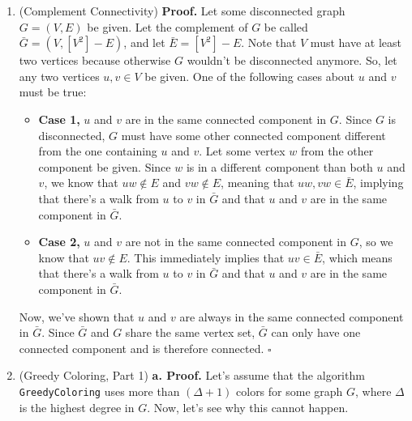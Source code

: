 \documentclass{article}
\begin{document}
\begin{enumerate}
    \pagebreak

  \item (Complement Connectivity)
    \textbf{Proof.} Let some disconnected graph $G = (V, E)$ be given. Let the complement of $G$ be called $\bar{G} = (V, [V^2] - E)$, and let $\bar{E} = [V^2] - E$. Note that $V$ must have at least two vertices because otherwise $G$ wouldn't be disconnected anymore. So, let any two vertices $u, v \in V$ be given. One of the following cases about $u$ and $v$ must be true:
    \begin{itemize}
      \item \textbf{Case 1,} $u$ and $v$ are in the same connected component in $G$. Since $G$ is disconnected, $G$ must have some other connected component different from the one containing $u$ and $v$. Let some vertex $w$ from the other component be given. Since $w$ is in a different component than both $u$ and $v$, we know that $uw \notin E$ and $vw \notin E$, meaning that $uw, vw \in \bar{E}$, implying that there's a walk from $u$ to $v$ in $\bar{G}$ and that $u$ and $v$ are in the same component in $\bar{G}$.
      \item \textbf{Case 2,} $u$ and $v$ are not in the same connected component in $G$, so we know that $uv \notin E$. This immediately implies that $uv \in \bar{E}$, which means that there's a walk from $u$ to $v$ in $\bar{G}$ and that $u$ and $v$ are in the same component in $\bar{G}$.
    \end{itemize}
    Now, we've shown that $u$ and $v$ are always in the same connected component in $\bar{G}$. Since $\bar{G}$ and $G$ share the same vertex set, $\bar{G}$ can only have one connected component and is therefore connected. $\square$

    \pagebreak

  \item (Greedy Coloring, Part 1)
    \textbf{a. Proof.} Let's assume that the algorithm \texttt{GreedyColoring} uses more than $(\Delta + 1)$ colors for some graph $G$, where $\Delta$ is the highest degree in $G$. Now, let's see why this cannot happen.


\end{enumerate}
\end{document}
